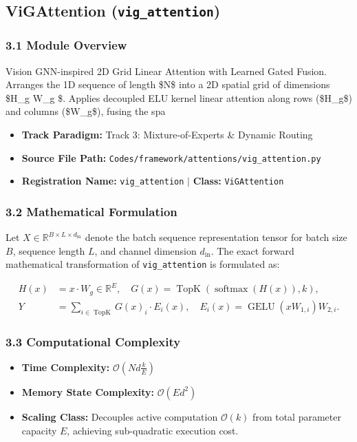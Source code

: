 \subsection{ViGAttention (\texttt{vig\_attention})}
\label{sec:app_module_vig\_attention}

\subsubsection*{3.1 Module Overview}
Vision GNN-inspired 2D Grid Linear Attention with Learned Gated Fusion.  Arranges the 1D sequence of length \$N\$ into a 2D spatial grid of dimensions \$H\_g \times W\_g \approx {} \times {}\$. Applies decoupled ELU kernel linear attention along rows (\$H\_g\$) and columns (\$W\_g\$), fusing the spa
\begin{itemize}
    \item \textbf{Track Paradigm:} Track 3: Mixture-of-Experts & Dynamic Routing
    \item \textbf{Source File Path:} \texttt{Codes/framework/attentions/vig\_attention.py}
    \item \textbf{Registration Name:} \texttt{vig\_attention} $\mid$ \textbf{Class:} \texttt{ViGAttention}
\end{itemize}

\subsubsection*{3.2 Mathematical Formulation}
Let $X \in \mathbb{R}^{B \times L \times d_{\text{in}}}$ denote the batch sequence representation tensor for batch size $B$, sequence length $L$, and channel dimension $d_{\text{in}}$. The exact forward mathematical transformation of \texttt{vig\_attention} is formulated as:

\begin{align}
H(x) &= x \cdot W_g \in \mathbb{R}^{E}, \quad G(x) = \operatorname{TopK}\left(\operatorname{softmax}(H(x)), k\right), \\
Y &= \sum_{i \in \operatorname{TopK}} G(x)_i \cdot E_i(x), \quad E_i(x) = \operatorname{GELU}(x W_{1, i}) W_{2, i}.
\end{align}


\subsubsection*{3.3 Computational Complexity}
\begin{itemize}
    \item \textbf{Time Complexity:} $\mathcal{O}(N d \frac{k}{E})$
    \item \textbf{Memory State Complexity:} $\mathcal{O}(E d^2)$
    \item \textbf{Scaling Class:} Decouples active computation $\mathcal{O}(k)$ from total parameter capacity $E$, achieving sub-quadratic execution cost.
\end{itemize}

